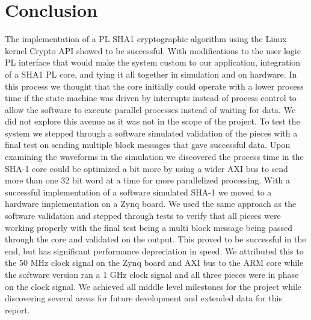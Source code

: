 \documentclass[journal]{IEEEtran}
\begin{document}
\section{Conclusion}
The implementation of a PL SHA1 cryptographic algorithm using the Linux kernel Crypto API showed to be successful.  With modifications to the user logic PL interface that would make the system custom to our application, integration of a SHA1 PL core, and tying it all together in simulation and on hardware.  In this process we thought that the core initially could operate with a lower process time if the state machine was driven by interrupts instead of process control to allow the software to execute parallel processes instead of waiting for data.  We did not explore this avenue as it was not in the scope of the project.  To test the system we stepped through a software simulated validation of the pieces with a final test on sending multiple block messages that gave successful data.  Upon examining the waveforms in the simulation we discovered the process time in the SHA-1 core could be optimized a bit more by using a wider AXI bus to send more than one 32 bit word at a time for more parallelized processing.
With a successful implementation of a software simulated SHA-1 we moved to a hardware implementation on a Zynq board.  We used the same approach as the software validation and stepped through tests to verify that all pieces were working properly with the final test being a multi block message being passed through the core and validated on the output.  This proved to be successful in the end, but has significant performance depreciation in speed.  We attributed this to the 50 MHz clock signal on the Zynq board and AXI bus to the ARM core while the software version ran a 1 GHz clock signal and all three pieces were in phase on the clock signal.  We achieved all middle level milestones for the project while discovering several areas for future development and extended data for this report.
\end{document}
